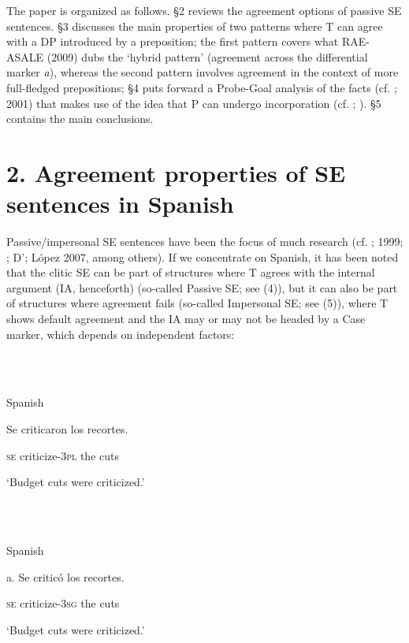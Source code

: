 \documentclass[output=paper]{langsci/langscibook}
\begin{document}
  The paper is organized as follows. §2 reviews the agreement options of passive SE sentences. §3 discusses the main properties of two patterns where T can agree with a DP introduced by a preposition; the first pattern covers what RAE-ASALE (2009) dubs the ‘hybrid pattern’ (agreement across the differential marker \textit{a}), whereas the second pattern involves agreement in the context of more full-fledged prepositions; §4 puts forward a Probe-Goal analysis of the facts (cf. \citealt{Chomsky2000}; 2001) that makes use of the idea that P can undergo incorporation (cf. \citet{Hornstein1981}; \citealt{Law2006}). §5 contains the main conclusions.

\section{ 2. Agreement properties of SE sentences in Spanish}

Passive/impersonal SE sentences have been the focus of much research (cf. \citealt{Mendikoetxea1992}; 1999; \citet{Raposo1996}; D’\citealt{Alessandro2007}; López 2007, among others). If we concentrate on Spanish, it has been noted that the clitic SE can be part of structures where T agrees with the internal argument (IA, henceforth) (so-called Passive SE; see (4)), but it can also be part of structures where agreement fails (so-called Impersonal SE; see (5)), where T shows default agreement and the IA may or may not be headed by a Case marker, which depends on independent factors:

\ea%
    \label{ex:key:4}
    \gll\\
        \\
    \glt
    \z

          Spanish

Se  criticaron        los recortes.        

  \textsc{se} criticize-\textsc{3pl}  the cuts

           ‘Budget cuts were criticized.’

\ea%
    \label{ex:key:5}
    \gll\\
        \\
    \glt
    \z

          Spanish

a.  Se   criticó             los  recortes.      

        \textsc{se}  criticize-\textsc{3sg}  the  cuts

                  ‘Budget cuts were criticized.’
\end{document}
